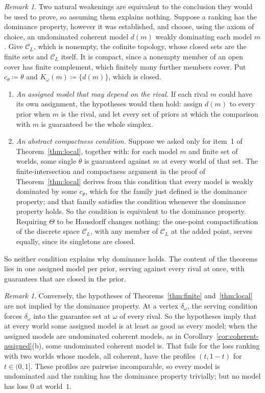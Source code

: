 \documentclass[11pt]{article}
\theoremstyle{definition}
\theoremstyle{remark}
\newtheorem{remark}[theorem]{Remark}
\newcommand{\C}{\mathcal C}
\begin{document}
\begin{remark}\label{rem:collapse}
Two natural weakenings are equivalent to the conclusion they would be used to prove, so assuming them explains nothing. Suppose a ranking has the dominance property, however it was established, and choose, using the axiom of choice, an undominated coherent model $d(m)$ weakly dominating each model $m$. Give $\C_L$, which is nonempty, the cofinite topology, whose closed sets are the finite sets and $\C_L$ itself. It is compact, since a nonempty member of an open cover has finite complement, which finitely many further members cover. Put $c_\theta\coloneqq\theta$ and $K_\omega(m)\coloneqq\{d(m)\}$, which is closed.
\begin{enumerate}[label=(\roman*)]
\item \emph{An assigned model that may depend on the rival.} If each rival $m$ could have its own assignment, the hypotheses would then hold: assign $d(m)$ to every prior when $m$ is the rival, and let every set of priors at which the comparison with $m$ is guaranteed be the whole simplex.
\item \emph{An abstract compactness condition.} Suppose we asked only for item~1 of Theorem~\ref{thm:local}, together with: for each model $m$ and finite set of worlds, some single $\theta$ is guaranteed against $m$ at every world of that set. The finite-intersection and compactness argument in the proof of Theorem~\ref{thm:local} derives from this condition that every model is weakly dominated by some $c_\theta$, which for the family just defined is the dominance property; and that family satisfies the condition whenever the dominance property holds. So the condition is equivalent to the dominance property. Requiring $\Theta$ to be Hausdorff changes nothing: the one-point compactification of the discrete space $\C_L$, with any member of $\C_L$ at the added point, serves equally, since its singletons are closed.
\end{enumerate}
So neither condition explains why dominance holds. The content of the theorems lies in one assigned model per prior, serving against every rival at once, with guarantees that are closed in the prior.
\end{remark}

\begin{remark}\label{rem:vertex}
Conversely, the hypotheses of Theorems~\ref{thm:finite} and~\ref{thm:local} are not implied by the dominance property. At a vertex $\delta_\omega$, the serving condition forces $\delta_\omega$ into the guarantee set at $\omega$ of every rival. So the hypotheses imply that at every world some assigned model is at least as good as every model; when the assigned models are undominated coherent models, as in Corollary~\ref{cor:coherent-assigned}(b), some undominated coherent model is. That fails for the loss ranking with two worlds whose models, all coherent, have the profiles $(t,1-t)$ for $t\in(0,1]$. These profiles are pairwise incomparable, so every model is undominated and the ranking has the dominance property trivially; but no model has loss $0$ at world~$1$.
\end{remark}
\end{document}
